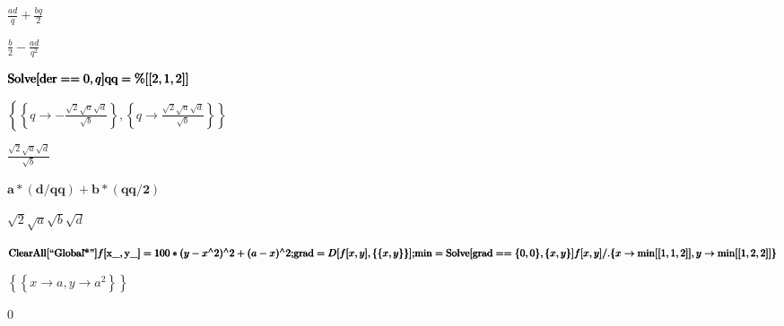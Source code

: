 \documentclass{article}
\begin{document}
\begin{doublespace}
\noindent\(\frac{a d}{q}+\frac{b q}{2}\)
\end{doublespace}

\begin{doublespace}
\noindent\(\frac{b}{2}-\frac{a d}{q^2}\)
\end{doublespace}

\begin{doublespace}
\noindent\(\pmb{\text{Solve}[\text{der} == 0, q]}\\
\pmb{\text{qq} = \%[[2,1,2]]}\)
\end{doublespace}

\begin{doublespace}
\noindent\(\left\{\left\{q\to -\frac{\sqrt{2} \sqrt{a} \sqrt{d}}{\sqrt{b}}\right\},\left\{q\to \frac{\sqrt{2} \sqrt{a} \sqrt{d}}{\sqrt{b}}\right\}\right\}\)
\end{doublespace}

\begin{doublespace}
\noindent\(\frac{\sqrt{2} \sqrt{a} \sqrt{d}}{\sqrt{b}}\)
\end{doublespace}

\begin{doublespace}
\noindent\(\pmb{a*(d/\text{qq})+b*(\text{qq}/2)}\)
\end{doublespace}

\begin{doublespace}
\noindent\(\sqrt{2} \sqrt{a} \sqrt{b} \sqrt{d}\)
\end{doublespace}

\begin{doublespace}
\noindent\(\pmb{\text{ClearAll}[\text{{``}Global$\grave{ }$*{''}}]}\\
\pmb{f[\text{x$\_$},\text{y$\_$}] = 100*(y-x{}^{\wedge}2){}^{\wedge}2+(a-x){}^{\wedge}2;}\\
\pmb{\text{grad} = D[f[x,y],\{\{x,y\}\}];}\\
\pmb{\min  = \text{Solve}[\text{grad}==\{0,0\},\{x,y\}]}\\
\pmb{f[x,y] \text{/.} \{x\to \min [[1,1,2]],y\to \min [[1,2,2]]\}}\)
\end{doublespace}

\begin{doublespace}
\noindent\(\left\{\left\{x\to a,y\to a^2\right\}\right\}\)
\end{doublespace}

\begin{doublespace}
\noindent\(0\)
\end{doublespace}
\end{document}
